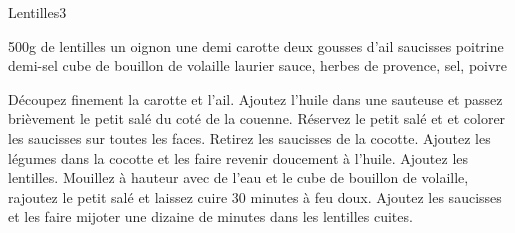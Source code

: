 \begin{recette}{Lentilles}{3}{}{}
\begin{ingredients}
\ingredient 500g de lentilles
\ingredient un oignon
\ingredient une demi carotte
\ingredient deux gousses d'ail
 saucisses
\ingredient poitrine demi-sel
\ingredient cube de bouillon de volaille
\ingredient laurier sauce, herbes de provence, sel, poivre
\end{ingredients}

\begin{preparation}
\etape Découpez finement la carotte et l'ail.
\etape Ajoutez l'huile dans une sauteuse et passez brièvement le petit salé du coté de la couenne.
\etape Réservez le petit salé et  et colorer les saucisses sur toutes les faces.
\etape Retirez les saucisses de la cocotte.
\etape Ajoutez les légumes dans la cocotte et les faire revenir doucement à l'huile.
\etape Ajoutez les lentilles. Mouillez à hauteur avec de l'eau et le cube de bouillon de volaille, rajoutez le petit salé et laissez cuire 30 minutes à feu doux.
\etape Ajoutez les saucisses et les faire mijoter une dizaine de minutes dans les lentilles cuites.
\end{preparation}

\end{recette}

